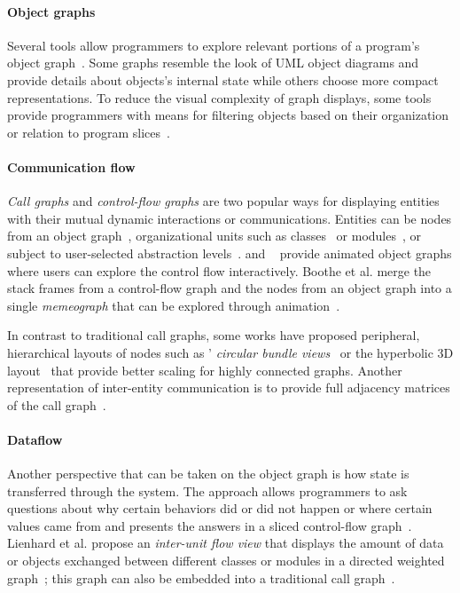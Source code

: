 \paragraph{Object graphs}

Several tools allow programmers to explore relevant portions of a program's object graph~\cite{moreno2004visualizing,gestwicki2005methodology}.
Some graphs resemble the look of UML object diagrams and provide details about objects's internal state while others choose more compact representations.
To reduce the visual complexity of graph displays, some tools provide programmers with means for filtering objects based on their organization or relation to program slices~\cite{lange1997object,hamouLhadj2004survey}.

\paragraph{Communication flow}

\emph{Call graphs} and \emph{control-flow graphs} are two popular ways for displaying entities with their mutual dynamic interactions or communications.
Entities can be nodes from an object graph~\cite{tramnitzke2007object}, organizational units such as classes~\cite{reiss2007visual} or modules~\cite{prestin2022hidden}, or subject to user-selected abstraction levels~\cite{lange1997object,dePauw1998execution,walker1998visualizing}.
 and ~\cite{schweizer2014pathobjects} provide animated object graphs where users can explore the control flow interactively.
Boothe et al. merge the stack frames from a control-flow graph and the nodes from an object graph into a single \emph{memeograph} that can be explored through animation~\cite{boothe2011animation}.

In contrast to traditional call graphs, some works have proposed peripheral, hierarchical layouts of nodes such as ' \emph{circular bundle views}~\cite{cornelissen2009trace} or the  hyperbolic 3D layout~\cite{munzner1997h3} that provide better scaling for highly connected graphs.
Another representation of inter-entity communication is to provide full adjacency matrices of the call graph~\cite{dePauw1994modeling}. %

\paragraph{Dataflow}

Another perspective that can be taken on the object graph is how state is transferred through the system.
The  approach allows programmers to ask questions about why certain behaviors did or did not happen or where certain values came from and presents the answers in a sliced control-flow graph~\cite{ko2008debugging}.
Lienhard et al. propose an \emph{inter-unit flow view} that displays the amount of data or objects exchanged between different classes or modules in a directed weighted graph~\cite{lienhard2009taking}; this graph can also be embedded into a traditional call graph~\cite{lienhard2009flow}.

